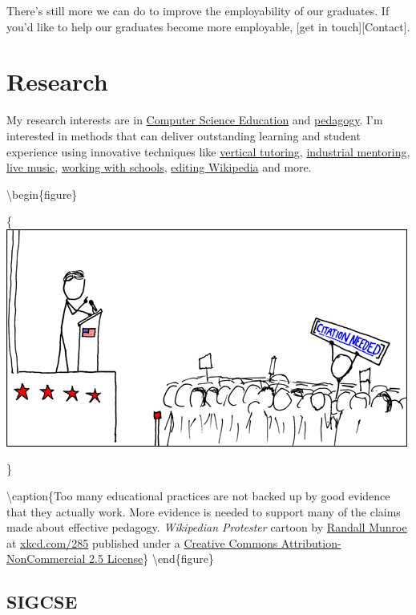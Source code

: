 \documentclass[
  12pt,
]{book}
\begin{document}
There's still more we can do to improve the employability of our graduates. If you'd like to help our graduates become more employable, {[}get in touch{]}{[}Contact{]}.

\hypertarget{research}{%
\chapter{Research}\label{research}}

My research interests are in \href{https://en.wikipedia.org/wiki/Computer_science_education}{Computer Science Education} and \href{https://en.wikipedia.org/wiki/Pedagogy}{pedagogy}. \citep{CERhandbook, JohnBiggs2011, Fry2014} I'm interested in methods that can deliver outstanding learning and student experience using innovative techniques like \protect\hyperlink{vt}{vertical tutoring}, \href{https://www.cs.manchester.ac.uk/connect/business-engagement/industrial-mentoring/}{industrial mentoring}, \protect\hyperlink{tuningcomplete}{live music}, \protect\hyperlink{coding-their-future}{working with schools}, \protect\hyperlink{wikipedia}{editing Wikipedia} and more.

\textbackslash begin\{figure\}

\{\centering \includegraphics[width=0.7\linewidth]{images/wikipedian_protester}

\}

\textbackslash caption\{Too many educational practices are not backed up by good evidence that they actually work. More evidence is needed to support many of the claims made about effective pedagogy. \emph{Wikipedian Protester} cartoon by \href{https://en.wikipedia.org/wiki/Randall_Munroe}{Randall Munroe} at \href{https://xkcd.com/285/}{xkcd.com/285} published under a \href{https://creativecommons.org/licenses/by-nc/2.5/}{Creative Commons Attribution-NonCommercial 2.5 License}\}\label{fig:unnamed-chunk-5}
\textbackslash end\{figure\}

\hypertarget{sigcse}{%
\section{SIGCSE}\label{sigcse}}
\end{document}
